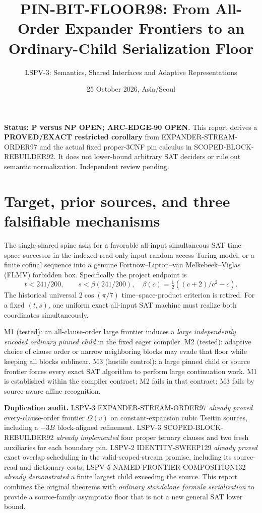 \documentclass[11pt]{article}
\title{PIN-BIT-FLOOR98: From All-Order Expander Frontiers to an Ordinary-Child Serialization Floor}
\author{LSPV-3: Semantics, Shared Interfaces and Adaptive Representations}
\date{25 October 2026, Asia/Seoul}
\begin{document}
\maketitle
\noindent\textbf{Status: P versus NP OPEN; ARC-EDGE-90 OPEN.} This report derives a \textbf{PROVED/EXACT restricted corollary} from EXPANDER-STREAM-ORDER97 and the actual fixed proper-3CNF pin calculus in SCOPED-BLOCK-REBUILDER92. It does not lower-bound arbitrary SAT deciders or rule out semantic normalization. Independent review pending.

\section{Target, prior sources, and three falsifiable mechanisms}
The single shared spine asks for a favorable all-input simultaneous SAT time--space successor in the indexed read-only-input random-access Turing model, or a finite cofinal sequence into a genuine Fortnow--Lipton--van Melkebeek--Viglas (FLMV) forbidden box. Specifically the project endpoint is
\[
t<241/200,\qquad s<\beta(241/200),\quad
\beta(c)=\tfrac12((c+2)/c^2-c).
\]
The historical universal $2\cos(\pi/7)$ time--space-product criterion is retired. For a fixed $(t,s)$, one uniform exact all-input SAT machine must realize both coordinates simultaneously.

M1 (tested): an all-clause-order large frontier induces a \emph{large independently encoded ordinary pinned child} in the fixed eager compiler. M2 (tested): adaptive choice of clause order or narrow neighboring blocks may evade that floor while keeping all blocks sublinear. M3 (hostile control): a large pinned child or source frontier forces every exact SAT algorithm to perform large continuation work. M1 is established within the compiler contract; M2 fails in that contract; M3 fails by source-aware affine recognition.

\textbf{Duplication audit.} LSPV-3 EXPANDER-STREAM-ORDER97 \emph{already proved} every-clause-order frontier $\Omega(v)$ on constant-expansion cubic Tseitin sources, including a $-3B$ block-aligned refinement. LSPV-3 SCOPED-BLOCK-REBUILDER92 \emph{already implemented} four proper ternary clauses and two fresh auxiliaries for each boundary pin. LSPV-2 IDENTITY-SWEEP129 \emph{already proved} exact overlap scheduling in the valid-scoped-stream promise, including its source-read and dictionary costs; LSPV-5 NAMED-FRONTIER-COMPOSITION132 \emph{already demonstrated} a finite largest child exceeding the source. This report combines the original theorems with \emph{ordinary standalone formula serialization} to provide a source-family asymptotic floor that is not a new general SAT lower bound.
\end{document}
